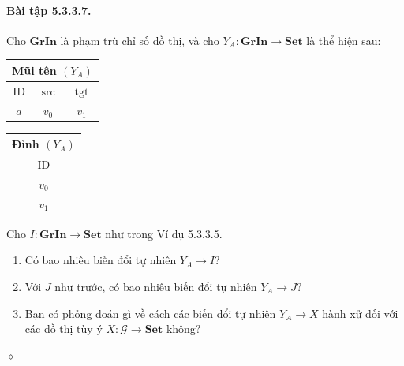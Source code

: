 \paragraph{Bài tập 5.3.3.7.} Cho $\mathbf{GrIn}$ là phạm trù chỉ số đồ thị, và cho $Y_A:\mathbf{GrIn}\to\mathbf{Set}$ là thể hiện sau:
\begin{center}\begin{tabular}{|c|c|c|}\hline\multicolumn{3}{|c|}{Mũi tên $(Y_A)$}\\\hline ID&$\operatorname{src}$&$\operatorname{tgt}$\\\hline$a$&$v_0$&$v_1$\\\hline\end{tabular}\qquad\begin{tabular}{|c|}\hline Đỉnh $(Y_A)$\\\hline ID\\\hline$v_0$\\$v_1$\\\hline\end{tabular}\end{center}
Cho $I:\mathbf{GrIn}\to\mathbf{Set}$ như trong Ví dụ 5.3.3.5.
\begin{enumerate}[label=\alph*.]
\item Có bao nhiêu biến đổi tự nhiên $Y_A\to I$?
\item Với $J$ như trước, có bao nhiêu biến đổi tự nhiên $Y_A\to J$?
\item Bạn có phỏng đoán gì về cách các biến đổi tự nhiên $Y_A\to X$ hành xử đối với các đồ thị tùy ý $X:\mathcal G\to\mathbf{Set}$ không?
\end{enumerate}\hfill$\diamond$
